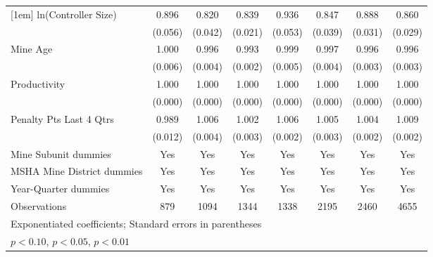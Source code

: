 {\begin{tabular}{l*{7}{c}}
[1em]
ln(Controller Size)      &       0.896\sym{*}  &       0.820\sym{***}&       0.839\sym{***}&       0.936         &       0.847\sym{***}&       0.888\sym{***}&       0.860\sym{***}\\
                         &     (0.056)         &     (0.042)         &     (0.021)         &     (0.053)         &     (0.039)         &     (0.031)         &     (0.029)         \\
[1em]
Mine Age                 &       1.000         &       0.996         &       0.993\sym{***}&       0.999         &       0.997         &       0.996         &       0.996         \\
                         &     (0.006)         &     (0.004)         &     (0.002)         &     (0.005)         &     (0.004)         &     (0.003)         &     (0.003)         \\
[1em]
Productivity             &       1.000         &       1.000         &       1.000         &       1.000         &       1.000         &       1.000\sym{**} &       1.000         \\
                         &     (0.000)         &     (0.000)         &     (0.000)         &     (0.000)         &     (0.000)         &     (0.000)         &     (0.000)         \\
[1em]
Penalty Pts Last 4 Qtrs  &       0.989         &       1.006         &       1.002         &       1.006\sym{**} &       1.005         &       1.004\sym{**} &       1.009\sym{***}\\
                         &     (0.012)         &     (0.004)         &     (0.003)         &     (0.002)         &     (0.003)         &     (0.002)         &     (0.002)         \\
[1em]
Mine Subunit dummies     &         Yes         &         Yes         &         Yes         &         Yes         &         Yes         &         Yes         &         Yes         \\
[1em]
MSHA Mine District dummies&         Yes         &         Yes         &         Yes         &         Yes         &         Yes         &         Yes         &         Yes         \\
[1em]
Year-Quarter dummies     &         Yes         &         Yes         &         Yes         &         Yes         &         Yes         &         Yes         &         Yes         \\
\hline
Observations             &         879         &        1094         &        1344         &        1338         &        2195         &        2460         &        4655         \\
\hline\hline
\multicolumn{8}{l}{\footnotesize Exponentiated coefficients; Standard errors in parentheses}\\
\multicolumn{8}{l}{\footnotesize \sym{*} \(p<0.10\), \sym{**} \(p<0.05\), \sym{***} \(p<0.01\)}\\
\end{tabular}
}
